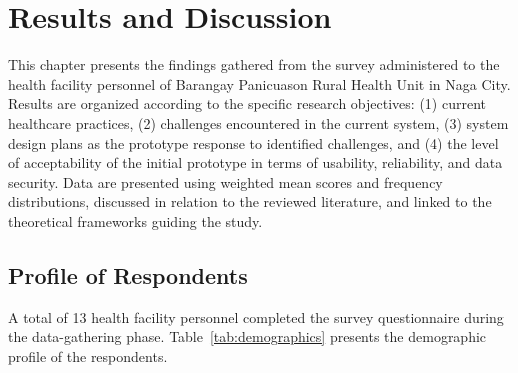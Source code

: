 \documentclass{research}
\begin{document}
\section{Results and Discussion}

This chapter presents the findings gathered from the survey administered to the health facility
personnel of Barangay Panicuason Rural Health Unit in Naga City. Results are organized according
to the specific research objectives: (1) current healthcare practices, (2) challenges encountered
in the current system, (3) system design plans as the prototype response to identified challenges,
and (4) the level of acceptability of the initial prototype in terms of usability, reliability,
and data security. Data are presented using weighted mean scores and frequency distributions,
discussed in relation to the reviewed literature, and linked to the theoretical frameworks guiding
the study.

\subsection*{Profile of Respondents}

A total of 13 health facility personnel completed the survey questionnaire during the data-gathering
phase. Table~\ref{tab:demographics} presents the demographic profile of the respondents.
\end{document}
